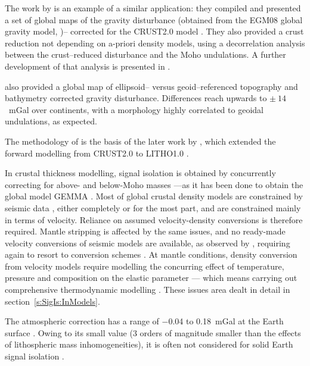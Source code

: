 The work by \textcite{Tenzer2009} is an example of a similar application: they compiled and presented a set of global maps of the gravity disturbance (obtained from the EGM08 global gravity model, \cite{Pavlis2012EGM2008})-- corrected for the {CRUST2.0} model \parencite{Bassin2000Crust20}.
They also provided a crust reduction not depending on a-priori density models, using a decorrelation analysis between the crust--reduced disturbance and the Moho undulations.
A further development of that analysis is presented in \textcite{Tenzer2012contrast}.

\Textcite{Tenzer2009} also provided a global map of ellipsoid-- versus geoid--referenced topography and bathymetry corrected gravity disturbance.
Differences reach upwards to $\pm~14$~\si{\milli Gal} over continents, with a morphology highly correlated to geoidal undulations, as expected.

The methodology of \textcite{Tenzer2009} is the basis of the later work by \textcite{Tenzer2019}, which extended the forward modelling from {CRUST2.0} to {LITHO1.0} \parencite{Pasyanos2014}.

In crustal thickness modelling, signal isolation is obtained by concurrently correcting for above- and below-Moho masses ---as it has been done to obtain the global model {GEMMA} \parencites{Reguzzoni2013}{Reguzzoni2015}.
Most of global crustal density models are constrained by seismic data \parencites[e.g.][]{Laske2012Crust10}{Pasyanos2014}{Szwillus2019}, either completely or for the most part, and are constrained mainly in terms of velocity.
Reliance on assumed velocity-density conversions is therefore required.
Mantle stripping is affected by the same issues, and no ready-made velocity conversions of seismic models are available, as observed by \textcite{Tenzer2015}, requiring again to resort to conversion schemes \parencite[e.g.][]{Sebera2018}.
At mantle conditions, density conversion from velocity models \parencites[e.g.][]{Simmons2010}{Schaeffer2013} require modelling the concurring effect of temperature, pressure and composition on the elastic parameter --- which means carrying out comprehensive thermodynamic modelling \parencites{Connolly2005}{Connolly2009}.
These issues area dealt in detail in section~\ref{s:SigIs:InModels}.

The atmospheric correction has a range of \num{-0.04} to \SI{0.18}{\milli Gal} at the Earth surface \parencite{Tenzer2009_AtmCorr}.
Owing to its small value (3 orders of magnitude smaller than the effects of lithospheric mass inhomogeneities), it is often not considered for solid Earth signal isolation \parencite[e.g][]{Tenzer2019}.

